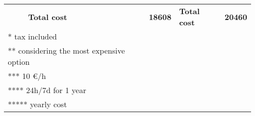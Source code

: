 \begin{table}[!hbt]
\begin{tabular}{llrlr}
                                                                                                                   & \textbf{Total cost}                 & \textbf{18608}                          & \textbf{Total cost}                                           & \textbf{20460}                          \\ \cline{2-5} 
\multicolumn{2}{l}{* tax included}                                                                                                                       & \multicolumn{1}{l}{}                    &                                                               & \multicolumn{1}{l}{}                    \\
\multicolumn{2}{l}{** considering the most expensive option}                                                                                             & \multicolumn{1}{l}{}                    &                                                               & \multicolumn{1}{l}{}                    \\
\multicolumn{2}{l}{*** 10 €/h}                                                                                                                           & \multicolumn{1}{l}{}                    &                                                               & \multicolumn{1}{l}{}                    \\
\multicolumn{2}{l}{**** 24h/7d for 1 year}                                                                                                               & \multicolumn{1}{l}{}                    &                                                               & \multicolumn{1}{l}{}                    \\
\multicolumn{2}{l}{***** yearly cost}                                                                                                                    & \multicolumn{1}{l}{}                    &                                                               & \multicolumn{1}{l}{}                    \\ \hline
\end{tabular}
\end{table}
\endgroup
% 
